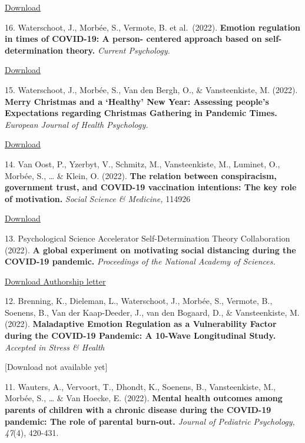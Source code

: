 \documentclass[
]{article}
\begin{document}
\href{download/sciencs/studies/2022-98394-001.pdf}{Download }

16. Waterschoot, J., Morbée, S., Vermote, B. et al.~(2022).
\textbf{Emotion regulation in times of COVID-19: A person- centered
approach based on self-determination theory.} \emph{Current Psychology.}

\href{download/sciencs/studies/6bf4ef7e-691e-4512-8b9d-a71ae5f8700e.pdf}{Download
}

15. Waterschoot, J., Morbée, S., Van den Bergh, O., \& Vansteenkiste, M.
(2022). \textbf{Merry Christmas and a `Healthy' New Year: Assessing
people's Expectations regarding Christmas Gathering in Pandemic Times.}
\emph{European Journal of Health Psychology.}

\href{download/sciencs/studies/2512-8442_a000114.pdf}{Download }

14. Van Oost, P., Yzerbyt, V., Schmitz, M., Vansteenkiste, M., Luminet,
O., Morbée, S., \ldots{} \& Klein, O. (2022). \textbf{The relation
between conspiracism, government trust, and COVID-19 vaccination
intentions: The key role of motivation.} \emph{Social Science \&
Medicine,} 114926

\href{download/sciencs/studies/1-s2.0-S0277953622002325-main.pdf}{Download
}

13. Psychological Science Accelerator Self-Determination Theory
Collaboration (2022). \textbf{A global experiment on motivating social
distancing during the COVID-19 pandemic.} \emph{Proceedings of the
National Academy of Sciences.}

\href{download/sciencs/studies/1-s2.0-S0277953622002325-main.pdf}{Download
} \textbar{}
\href{download/sciencs/studies/Authorship_Letter_321.pdf}{Authorship
letter }

12. Brenning, K., Dieleman, L., Waterschoot, J., Morbée, S., Vermote,
B., Soenens, B., Van der Kaap-Deeder, J., van den Bogaard, D., \&
Vansteenkiste, M. (2022). \textbf{Maladaptive Emotion Regulation as a
Vulnerability Factor during the COVID-19 Pandemic: A 10-Wave
Longitudinal Study.} \emph{Accepted in Stress \& Health}

{[}Download not available yet{]}

11. Wauters, A., Vervoort, T., Dhondt, K., Soenens, B., Vansteenkiste,
M., Morbée, S., \ldots{} \& Van Hoecke, E. (2022). \textbf{Mental health
outcomes among parents of children with a chronic disease during the
COVID-19 pandemic: The role of parental burn-out.} \emph{Journal of
Pediatric Psychology, 47}(4), 420-431.
\end{document}
